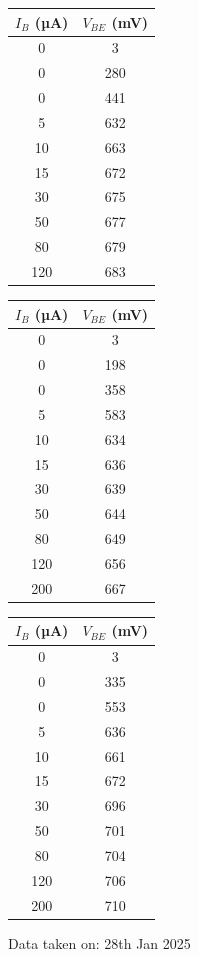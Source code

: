 \documentclass[%
sor,
 jor,
 amsmath,amssymb,
 reprint,
]{revtex4-2}
\begin{document}
\begin{center}
\begin{minipage}{0.31\linewidth}
\centering
{}
\begin{tabular}{|c|c|}
\hline
$I_B$ (µA) & $V_{BE}$ (mV) \\
\hline
0 & 3   \\
0 & 280 \\
0 & 441 \\
5 & 632 \\
10 & 663 \\
15 & 672 \\
30 & 675 \\
50 & 677 \\
80 & 679 \\
120 & 683 \\
\hline
\end{tabular}
\end{minipage}
\begin{minipage}{0.32\linewidth}
	\centering
\begin{tabular}{|c|c|}
\hline
$I_B$ (µA) & $V_{BE}$ (mV) \\
\hline
0 & 3   \\
0 & 198 \\
0 & 358 \\
5 & 583 \\
10 & 634 \\
15 & 636 \\
30 & 639 \\
50 & 644 \\
80 & 649 \\
120 & 656 \\
200 & 667 \\
\hline
\end{tabular}
\end{minipage}
\hfill
\begin{minipage}{0.34\linewidth}
\centering
{}
\begin{tabular}{|c|c|}
\hline
$I_B$ (µA) & $V_{BE}$ (mV)\\
\hline
0 & 3   \\
0 & 335 \\
0 & 553 \\
5 & 636 \\
10 & 661 \\
15 & 672 \\
30 & 696 \\
50 & 701 \\
80 & 704 \\
120 & 706 \\
200 & 710 \\
\hline
\end{tabular}
\end{minipage}
\end{center}
\begin{center}
Data taken on: 28th Jan 2025 
\end{center}
\end{document}
